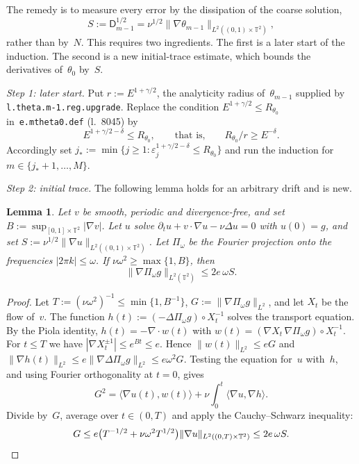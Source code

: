 \documentclass[11pt]{amsart}
\makeatletter
\newcommand{\ep}{\varepsilon}
\newcommand{\TT}{\mathbb{T}}
\newcommand{\Ln}[1]{l.~#1}
\newcommand{\lab}[1]{\texttt{#1}}
\renewcommand\paragraph{\@startsection{paragraph}{4}{\z@}{.5\linespacing\@plus.2\linespacing}{-.5em}{\normalfont\bfseries}}
\newtheorem{lemma}{Lemma}[section]
\theoremstyle{remark}
\makeatother
\begin{document}
\paragraph{Repair.}
The remedy is to measure every error by the dissipation of the coarse solution,
\begin{equation*}
S:=\mathsf D_{m-1}^{1/2}=\nu^{1/2}\|\nabla\theta_{m-1}\|_{L^2((0,1)\times\TT^2)},
\end{equation*}
rather than by~$N$. This requires two ingredients. The first is a later start of the induction. The second is a new initial-trace estimate, which bounds the derivatives of~$\theta_0$ by~$S$.

\emph{Step 1: later start.} Put $r:=E^{1+\gamma/2}$, the analyticity radius of~$\theta_{m-1}$ supplied by \lab{l.theta.m-1.reg.upgrade}. Replace the condition $E^{1+\gamma/2}\leq R_{\theta_0}$ in~\lab{e.mtheta0.def} (\Ln{8045}) by
\begin{equation}
\label{e.later}
E^{1+\gamma/2-\delta}\leq R_{\theta_0}, \qquad\text{that is,}\qquad R_{\theta_0}/r\geq E^{-\delta}.
\end{equation}
Accordingly set $j_*:=\min\{j\geq1:\ep_j^{1+\gamma/2-\delta}\leq R_{\theta_0}\}$ and run the induction for $m\in\{j_*+1,\ldots,M\}$.

\emph{Step 2: initial trace.} The following lemma holds for an arbitrary drift and is new.

\begin{lemma}
\label{l.trace}
Let $v$ be smooth, periodic and divergence-free, and set $B:=\sup_{[0,1]\times\TT^2}|\nabla v|$. Let $u$ solve $\partial_tu+v\cdot\nabla u-\nu\Delta u=0$ with $u(0)=g$, and set $S:=\nu^{1/2}\|\nabla u\|_{L^2((0,1)\times\TT^2)}$. Let $\Pi_\omega$ be the Fourier projection onto the frequencies $|2\pi k|\leq\omega$. If $\nu\omega^2\geq\max\{1,B\}$, then
\begin{equation*}
\|\nabla\Pi_\omega g\|_{L^2(\TT^2)}\leq 2e\,\omega S .
\end{equation*}
\end{lemma}
\begin{proof}
Let $T:=(\nu\omega^2)^{-1}\leq\min\{1,B^{-1}\}$, $G:=\|\nabla\Pi_\omega g\|_{L^2}$, and let $X_t$ be the flow of~$v$. The function $h(t):=(-\Delta\Pi_\omega g)\circ X_t^{-1}$ solves the transport equation. By the Piola identity, $h(t)=-\nabla\cdot w(t)$ with $w(t)=(\nabla X_t\,\nabla\Pi_\omega g)\circ X_t^{-1}$. For $t\leq T$ we have $|\nabla X_t^{\pm1}|\leq e^{Bt}\leq e$. Hence $\|w(t)\|_{L^2}\leq eG$ and $\|\nabla h(t)\|_{L^2}\leq e\|\nabla\Delta\Pi_\omega g\|_{L^2}\leq e\omega^2G$. Testing the equation for~$u$ with~$h$, and using Fourier orthogonality at $t=0$, gives
\begin{equation*}
G^2=\langle\nabla u(t),w(t)\rangle+\nu\int_0^t\langle\nabla u,\nabla h\rangle .
\end{equation*}
Divide by~$G$, average over $t\in(0,T)$ and apply the Cauchy--Schwarz inequality:
\begin{equation*}
G\leq e\bigl(T^{-1/2}+\nu\omega^2T^{1/2}\bigr)\|\nabla u\|_{L^2((0,T)\times\TT^2)}\leq 2e\,\omega S. \qedhere
\end{equation*}
\end{proof}
\end{document}
